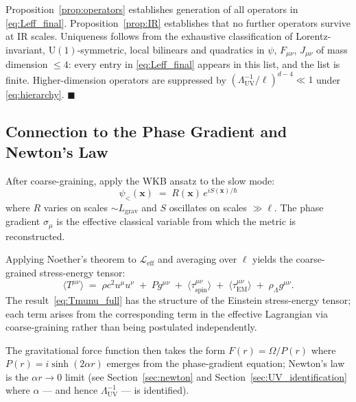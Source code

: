 \documentclass[11pt,a4paper]{article}
\theoremstyle{definition}
\theoremstyle{remark}
\begin{document}
		Proposition~\ref{prop:operators} establishes generation of all operators in
		\eqref{eq:Leff_final}.  Proposition~\ref{prop:IR} establishes that no further
		operators survive at IR scales.  Uniqueness follows from the exhaustive
		classification of Lorentz-invariant, $\mathrm{U}(1)$-symmetric, local
		bilinears and quadratics in $\psi$, $F_{\mu\nu}$, $J_{\mu\nu}$ of mass
		dimension $\leq 4$: every entry in \eqref{eq:Leff_final} appears in this
		list, and the list is finite. Higher-dimension operators are suppressed by
		$(\Lambda_{\mathrm{UV}}^{-1}/\ell)^{d-4} \ll 1$ under \eqref{eq:hierarchy}.
		\hfill$\blacksquare$
	
	\subsection{Connection to the Phase Gradient and Newton's Law}
	\label{sec:coarse:F}
	
	After coarse-graining, apply the WKB ansatz to the slow mode:
	\begin{equation}
		\psi_{<}(\mathbf{x})
		\;=\; R(\mathbf{x})\,e^{iS(\mathbf{x})/\hbar}
	\end{equation}
	where $R$ varies on scales $\sim L_{\mathrm{grav}}$ and $S$ oscillates on
	scales $\gg \ell$.  The phase gradient $\sigma_\mu$ is the effective classical
	variable from which the metric is reconstructed.
	
	Applying Noether's theorem to $\mathcal{L}_{\mathrm{eff}}$ and averaging over
	$\ell$ yields the coarse-grained stress-energy tensor:
	\begin{equation}
		\boxed{
			\langle T^{\mu\nu}\rangle
			\;=\; \rho c^2 u^\mu u^\nu
			\;+\; Pg^{\mu\nu}
			\;+\; \langle\tau^{\mu\nu}_{\mathrm{spin}}\rangle
			\;+\; \langle\tau^{\mu\nu}_{\mathrm{EM}}\rangle
			\;+\; \rho_\Lambda g^{\mu\nu}.
		}
		\label{eq:Tmunu_full}
	\end{equation}
	The result~\eqref{eq:Tmunu_full} has the structure of the Einstein stress-energy tensor; each term arises from the corresponding term in the effective Lagrangian via coarse-graining rather than being postulated independently.
	
	The gravitational force function then takes the form $F(r) = \Omega/P(r)$
	where $P(r) = i\sinh(2\alpha r)$ emerges from the phase-gradient equation;
	Newton's law is the $\alpha r \to 0$ limit (see Section~\ref{sec:newton} and
	Section~\ref{sec:UV_identification} where $\alpha$ --- and hence
	$\Lambda_{\mathrm{UV}}^{-1}$ --- is identified).
	
\end{document}

